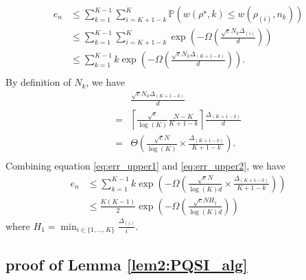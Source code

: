     \begin{equation} \label{eq:err_upper1}
        \begin{aligned} 
            e_n & \leq \sum_{k=1}^{K-1}\sum_{i = K+1-k}^K \mathbb{P}(w({\rho^\star,k}) \leq w({\rho_{(i)},n_k})) \\
            & \leq \sum_{k=1}^{K-1}\sum_{i = K+1-k}^K \exp\left( - \Omega\left(\frac{\sqrt{c}N_k \Delta_{(i)}}{d}\right)\right) \\
            &  \leq \sum_{k=1}^{K-1} k \exp\left( -\Omega\left( \frac{\sqrt{c}N_k \Delta_{(K+1-k)}}{d}\right)\right). \\
        \end{aligned}
    \end{equation}
    By definition of $N_k$, we have
    \begin{equation} \label{eq:err_upper2}
        \begin{aligned}
            & \frac{\sqrt{c}N_k \Delta_{(K+1-k)}}{d} \\
            = & \left\lceil \frac{\sqrt{c}}{\overline{\log}(K)} \frac{N-K}{K+1-k}\right\rceil\frac{\Delta_{(K+1-k)}}{d} \\
            = &\Theta\left( \frac{\sqrt{c}N}{\overline{\log}(K)} \times \frac{\Delta_{(K+1-k)}}{K+1-k}\right). \\
        \end{aligned}
    \end{equation}
    Combining equation \eqref{eq:err_upper1} and \eqref{eq:err_upper2}, we have
    \begin{equation*}
        \begin{aligned}
            e_n & \leq \sum_{k=1}^{K-1} k \exp\left( -\Omega\left(\frac{\sqrt{c}N}{\overline{\log}(K)d} \times\frac{\Delta_{(K+1-k)}}{K+1-k}\right)\right) \\
            & \leq \frac{K(K-1)}{2} \exp\left( -\Omega\left(\frac{\sqrt{c}NH_1}{\overline{\log}(K)d}\right)\right)
        \end{aligned}
    \end{equation*}
    where $H_1 = \min_{i \in \{1,...,K\}} \frac{\Delta_{(i)}}{i}$.

    
\subsection{proof of Lemma \ref{lem2:PQSI_alg}}
\label{subsec:PQSI_alg2}

